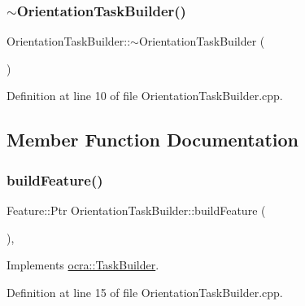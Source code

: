 \subsubsection{\texorpdfstring{$\sim$\+Orientation\+Task\+Builder()}{~OrientationTaskBuilder()}}
{\footnotesize\ttfamily Orientation\+Task\+Builder\+::$\sim$\+Orientation\+Task\+Builder (\begin{DoxyParamCaption}{ }\end{DoxyParamCaption})\hspace{0.3cm}{\ttfamily [virtual]}}



Definition at line 10 of file Orientation\+Task\+Builder.\+cpp.



\subsection{Member Function Documentation}
\hypertarget{classocra_1_1OrientationTaskBuilder_a38d5badfcdbcdbc745f305e38af8b737}{}\label{classocra_1_1OrientationTaskBuilder_a38d5badfcdbcdbc745f305e38af8b737} 
\subsubsection{\texorpdfstring{build\+Feature()}{buildFeature()}}
{\footnotesize\ttfamily Feature\+::\+Ptr Orientation\+Task\+Builder\+::build\+Feature (\begin{DoxyParamCaption}{ }\end{DoxyParamCaption})\hspace{0.3cm}{\ttfamily [protected]}, {\ttfamily [virtual]}}



Implements \hyperlink{classocra_1_1TaskBuilder_a58c0dc416a9607a344a080248ee26ac2}{ocra\+::\+Task\+Builder}.



Definition at line 15 of file Orientation\+Task\+Builder.\+cpp.

\hypertarget{classocra_1_1OrientationTaskBuilder_af5f11bdd9c43cb52e29054c6b293d533}{}\label{classocra_1_1OrientationTaskBuilder_af5f11bdd9c43cb52e29054c6b293d533} 
